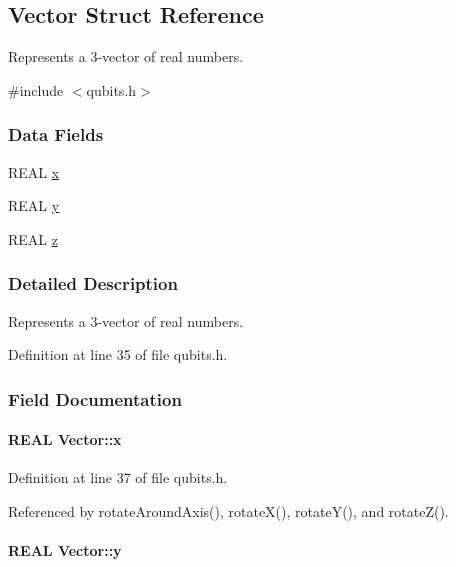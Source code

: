 \hypertarget{structVector}{
\subsection{Vector Struct Reference}
\label{structVector}
}


Represents a 3-\/vector of real numbers.  


{\ttfamily \#include $<$qubits.h$>$}\subsubsection*{Data Fields}
\begin{DoxyCompactItemize}
\item 
REAL \hyperlink{structVector_aac7abe171ba4bada50ed72acba6259fc}{x}
\item 
REAL \hyperlink{structVector_a375ca805d4c808a53d7c4e0c737ae3de}{y}
\item 
REAL \hyperlink{structVector_ad4e863651be7d6b7e2b28cd7445a0ccf}{z}
\end{DoxyCompactItemize}


\subsubsection{Detailed Description}
Represents a 3-\/vector of real numbers. 

Definition at line 35 of file qubits.h.

\subsubsection{Field Documentation}
\hypertarget{structVector_aac7abe171ba4bada50ed72acba6259fc}{
\paragraph[{x}]{\setlength{\rightskip}{0pt plus 5cm}REAL {\bf Vector::x}}\hfill}
\label{structVector_aac7abe171ba4bada50ed72acba6259fc}


Definition at line 37 of file qubits.h.

Referenced by rotateAroundAxis(), rotateX(), rotateY(), and rotateZ().\hypertarget{structVector_a375ca805d4c808a53d7c4e0c737ae3de}{
\paragraph[{y}]{\setlength{\rightskip}{0pt plus 5cm}REAL {\bf Vector::y}}\hfill}
\label{structVector_a375ca805d4c808a53d7c4e0c737ae3de}


